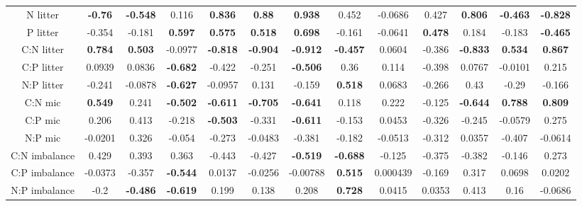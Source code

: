 \documentclass[authoryear,preprint,review,12pt]{elsarticle}
\begin{document}
\begin{landscape}
\begin{table}[h!]
\begin{center}
{\begin{tabular}{ccccccccccccc}
  N litter & \textbf{ -0.76 } & \textbf{ -0.548 } & 0.116 & \textbf{ 0.836 } & \textbf{ 0.88 } & \textbf{ 0.938 } & 0.452 & -0.0686 & 0.427 & \textbf{ 0.806 } & \textbf{ -0.463 } & \textbf{ -0.828 } \\ 
  P litter & -0.354 & -0.181 & \textbf{ 0.597 } & \textbf{ 0.575 } & \textbf{ 0.518 } & \textbf{ 0.698 } & -0.161 & -0.0641 & \textbf{ 0.478 } & 0.184 & -0.183 & \textbf{ -0.465 } \\ 
  C:N litter & \textbf{ 0.784 } & \textbf{ 0.503 } & -0.0977 & \textbf{ -0.818 } & \textbf{ -0.904 } & \textbf{ -0.912 } & \textbf{ -0.457 } & 0.0604 & -0.386 & \textbf{ -0.833 } & \textbf{ 0.534 } & \textbf{ 0.867 } \\ 
  C:P litter & 0.0939 & 0.0836 & \textbf{ -0.682 } & -0.422 & -0.251 & \textbf{ -0.506 } & 0.36 & 0.114 & -0.398 & 0.0767 & -0.0101 & 0.215 \\ 
  N:P litter & -0.241 & -0.0878 & \textbf{ -0.627 } & -0.0957 & 0.131 & -0.159 & \textbf{ 0.518 } & 0.0683 & -0.266 & 0.43 & -0.29 & -0.166 \\ 
  C:N mic & \textbf{ 0.549 } & 0.241 & \textbf{ -0.502 } & \textbf{ -0.611 } & \textbf{ -0.705 } & \textbf{ -0.641 } & 0.118 & 0.222 & -0.125 & \textbf{ -0.644 } & \textbf{ 0.788 } & \textbf{ 0.809 } \\ 
  C:P mic & 0.206 & 0.413 & -0.218 & \textbf{ -0.503 } & -0.331 & \textbf{ -0.611 } & -0.153 & 0.0453 & -0.326 & -0.245 & -0.0579 & 0.275 \\ 
  N:P mic & -0.0201 & 0.326 & -0.054 & -0.273 & -0.0483 & -0.381 & -0.182 & -0.0513 & -0.312 & 0.0357 & -0.407 & -0.0614 \\ 
  C:N imbalance & 0.429 & 0.393 & 0.363 & -0.443 & -0.427 & \textbf{ -0.519 } & \textbf{ -0.688 } & -0.125 & -0.375 & -0.382 & -0.146 & 0.273 \\ 
  C:P imbalance & -0.0373 & -0.357 & \textbf{ -0.544 } & 0.0137 & -0.0256 & -0.00788 & \textbf{ 0.515 } & 0.000439 & -0.169 & 0.317 & 0.0698 & 0.0202 \\ 
  N:P imbalance & -0.2 & \textbf{ -0.486 } & \textbf{ -0.619 } & 0.199 & 0.138 & 0.208 & \textbf{ 0.728 } & 0.0415 & 0.0353 & 0.413 & 0.16 & -0.0686 \\ 
   \hline
\end{tabular}
}
\end{center}
\end{table}\end{landscape}
\end{document}
